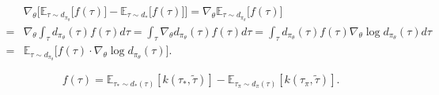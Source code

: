 % 
% 
% 


\begin{align*}
& \nabla_{\theta} \Big[ \mathbb{E}_{\tau\sim d_{\pi_{\theta}}} \big[ f(\tau) \big] - \mathbb{E}_{\tau\sim d_*} \big[ f(\tau) \big] \Big] 
= \nabla_{\theta} \mathbb{E}_{\tau\sim d_{\pi_{\theta}}} \big[ f(\tau) \big] \\
= & \nabla_{\theta} \int_{\tau} d_{\pi_{\theta}}(\tau) f(\tau) d\tau 
= \int_{\tau} \nabla_{\theta} d_{\pi_{\theta}}(\tau) f(\tau) d\tau 
= \int_{\tau}  d_{\pi_{\theta}}(\tau) f(\tau) \nabla_{\theta}\log d_{\pi_{\theta}}(\tau)  d\tau \\
= & \mathbb{E}_{\tau\sim d_{\pi_\theta}} \big[ f(\tau) \cdot \nabla_{\theta}\log d_{\pi_{\theta}}(\tau) \big].
\end{align*}

\begin{equation*}
f(\tau) = \mathbb{E}_{\tau_{*}\sim d_{*}(\tau)}[k(\tau_{*}, \tilde{\tau})] - \mathbb{E}_{\tau_{\pi}\sim d_{\pi}(\tau)}[k(\tau_{\pi}, \tilde{\tau})].
\end{equation*}

